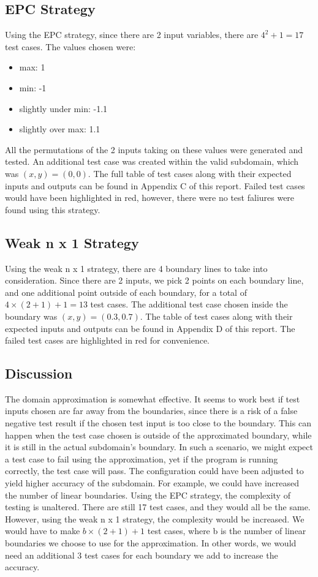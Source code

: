 \documentclass[letterpaper]{article}
\begin{document}
\subsection{EPC Strategy}
Using the EPC strategy, since there are 2 input variables, there are
$4^2 + 1 = 17$ test cases. The values chosen were:
\begin{itemize}
	\item max: 1
	\item min: -1
	\item slightly under min: -1.1
	\item slightly over max: 1.1
\end{itemize}
All the permutations of the 2 inputs taking on these values were generated
and tested. An additional test case was created within the valid subdomain,
which was $(x,y) = (0, 0)$. The full table of test cases
along with their expected inputs and outputs can be found in Appendix C of this
report. Failed test cases would have been highlighted in red, however,
there were no test faliures were found using this strategy.

\subsection{Weak n x 1 Strategy}
Using the weak n x 1 strategy, there are 4 boundary lines to take into
consideration. Since there are 2 inputs, we pick 2 points on each boundary
line, and one additional point outside of each boundary, for a total of
$4\times (2 + 1) + 1 = 13$ test cases. The additional test case chosen inside
the boundary was $(x, y) = (0.3, 0.7)$. The table of test cases
along with their expected inputs and outputs can be found in Appendix D of this
report. The failed test cases are highlighted in red for convenience.

\subsection{Discussion}
The domain approximation is somewhat effective. It seems to work best if
test inputs chosen are far away from the boundaries, since there is a risk
of a false negative test result if the chosen test input is too close to the
boundary. This can happen when the test case chosen is outside of the
approximated boundary, while it is still in the actual subdomain's boundary.
In such a scenario, we might expect a test case to fail using the
approximation, yet if the program is running correctly, the test case will
pass. The configuration could have been adjusted to yield higher accuracy
of the subdomain. For example, we could have increased the number of linear
boundaries. Using the EPC strategy, the complexity of testing is unaltered. 
There are still 17 test cases, and they would all be the same. However,
using the weak n x 1 strategy, the complexity would be increased.
We would have to make $b \times (2 + 1) + 1$ test cases, where b is
the number of linear boundaries we choose to use for the approximation.
In other words, we would need an additional 3 test cases for each boundary
we add to increase the accuracy. 
\end{document}
